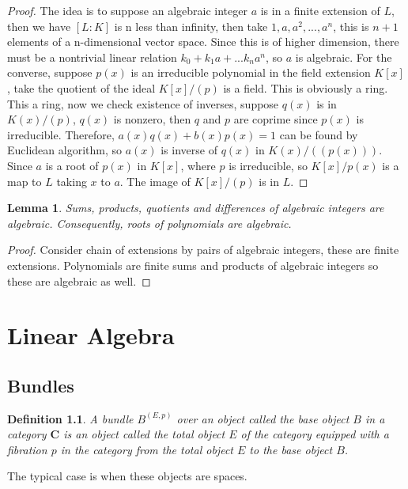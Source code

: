 \documentclass{tufte-book}
\newtheorem{definition}[theorem]{Definition}
\newtheorem{lemma}[theorem]{Lemma}
\begin{document}
\begin{proof}
The idea is to suppose an algebraic integer $a$ is in a finite extension of $L$, then we have $[L:K]$ is n less than infinity, then take $1, a, a^2, ..., a^n$, this is $n + 1$ elements of a n-dimensional vector space. Since this is of higher dimension, there must be a nontrivial linear relation $k_0 + k_1 a + ... k_n a^n$, so $a$ is algebraic. For the converse, suppose $p(x)$ is an irreducible polynomial in the field extension $K[x]$, take the quotient of the ideal $K[x]/(p)$ is a field. This is obviously a ring. This a ring, now we check existence of inverses, suppose $q(x)$ is in $K(x)/(p)$, $q(x)$ is nonzero, then $q$ and $p$ are coprime since $p(x)$ is irreducible. Therefore, $a(x)q(x) + b(x) p(x) = 1$ can be found by Euclidean algorithm, so $a(x)$ is inverse of $q(x)$ in $K(x)/((p(x)))$. Since $a$ is a root of $p(x)$ in $K[x]$, where $p$ is irreducible, so $K[x]/p(x)$ is a map to $L$ taking $x$ to $a$. The image of $K[x]/(p)$ is in $L$.
\end{proof}

\begin{lemma}
    Sums, products, quotients and differences of algebraic integers are algebraic. Consequently, roots of polynomials are algebraic.
\end{lemma}

\begin{proof}
    Consider chain of extensions by pairs of algebraic integers, these are finite extensions. Polynomials are finite sums and products of algebraic integers so these are algebraic as well.
\end{proof}

\chapter{Linear Algebra}
\label{ch:lin-alg}

\section{Bundles}

\begin{definition}
	A bundle $B^{(E,p)}$ over an object called the base object $B$ in a category $\mathbf{C}$ is an object called the total object $E$ of the category equipped with a fibration $p$ in the category from the total object $E$ to the base object $B$.
\end{definition}

The typical case is when these objects are spaces.
\end{document}

